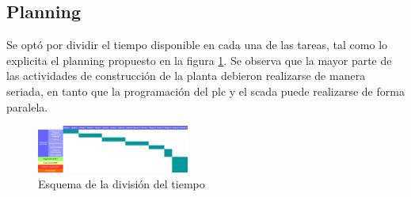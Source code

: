 \subsection{Planning}
Se optó por dividir el tiempo disponible en cada una de las tareas, tal como lo
explicita el planning propuesto en la figura \ref{fig:EDT}.
Se observa que la mayor parte de las actividades de construcción de la planta
debieron realizarse de manera seriada, en tanto que la programación del
\gls{plc} y el \gls{scada} puede realizarse de forma paralela.
\begin{figure}[ht!]
	\centering
	\includegraphics[angle=-90,
		width=0.445\textwidth]{Cap1-Introduccion/images/EDT.pdf}
	\caption{Esquema de la división del tiempo}
	\label{fig:EDT}
\end{figure}
